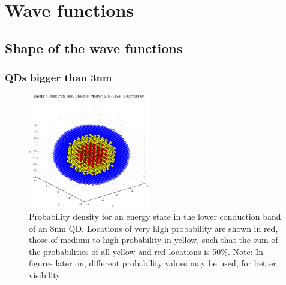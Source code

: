 \section{Wave functions}

\subsection{Shape of the wave functions}

\subsubsection{QDs bigger than 3nm} 

\begin{figure}
	\centering
	\includegraphics[width=200px]{Fig/Plots/r4CBMod6}
	\caption{Probability density for an energy state in the lower conduction band of an 8nm QD. Locations of very high probability are shown in red, those of medium to high probability in yellow, such that the sum of the probabilities of all yellow and red locations is 50\%. Note: In figures later on, different probability values may be used, for better visibility.}
	\label{fig:sphericalWaveFn}
\end{figure}
%
